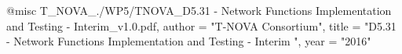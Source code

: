 @misc{ T_NOVA_./WP5/TNOVA_D5.31 - Network Functions Implementation and Testing - Interim_v1.0.pdf,
       author = "T-NOVA Consortium",
       title = "D5.31 - Network Functions Implementation and Testing - Interim ",
       year = "2016" }
